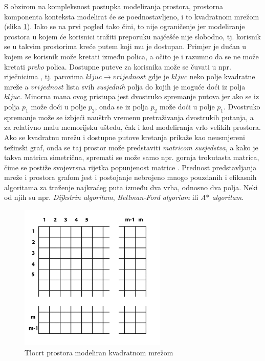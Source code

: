 \documentclass[times, utf8, diplomski, numeric]{fer}
\begin{document}
S obzirom na kompleksnost postupka modeliranja prostora, prostorna komponenta
konteksta modelirat će se poednostavljeno, i to kvadratnom mrežom
(slika \ref{fig:StoreGrid}). Iako se na prvi pogled tako čini, to nije
ograničenje jer modeliranje prostora u kojem će korisnici tražiti preporuku
najčešće nije slobodno, tj. korisnik se u takvim prostorima kreće putem koji mu
je dostupan. Primjer je dućan u kojem se korisnik može kretati između polica, a
očito je i razumno da se ne može kretati \emph{preko} polica.
Dostupne puteve za korisnika može se čuvati u npr. riječnicima
, tj. parovima $kljuc \rightarrow vrijednost$ gdje je $kljuc$
neko polje kvadratne mreže a $vrijednost$ lista svih \emph{susjednih} polja do
kojih je moguće doći iz polja $kljuc$. Minorna mana ovog pristupa jest
dvostruko spremanje putova jer ako se iz polja $p_1$ može doći u polje $p_2$,
onda se iz polja $p_2$ može doći u polje $p_1$. Dvostruko spremanje može se
izbjeći nauštrb vremenu pretraživanja dvostrukih putanja, a za relativno malu
memorijsku uštedu, čak i kod modeliranja vrlo velikih prostora.
Ako se kvadratnu mrežu i dostupne putove kretanja prikaže kao neusmjereni
težinski graf, onda se taj prostor može predstaviti \emph{matricom
susjedstva}, a kako je takva matrica simetrična, spremati se može samo npr.
gornja trokutasta matrica, čime se postiže svojevrsna rijetka popunjenost
matrice .
Prednost predstavljanja mreže i prostora grafom jest i postojanje nebrojeno
mnogo pouzdanih i efikasnih algoritama za traženje najkraćeg puta između dva
vrha, odnosno dva polja. Neki od njih su npr. \emph{Dijkstrin algoritam},
\emph{Bellman-Ford algoriam} ili \emph{A$\ast$ algoritam}.

\begin{figure}[htb]
	\centering
	\includegraphics[width=7cm]{images/grid.png}
	\caption{Tlocrt prostora modeliran kvadratnom mrežom}
	\label{fig:StoreGrid}
\end{figure}
\end{document}
